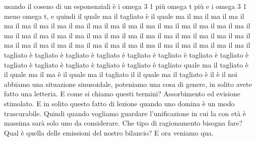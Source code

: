 \begin{soluzione}
{usando il coseno di un esponenziali è i omega 3 1 più omega t più e i omega 3 1 meno omega t, e quindi il quale ma il tagliato è il quale ma il ma il ma il ma il ma il ma il ma il ma il ma il ma il ma il ma il ma il ma il ma il ma il ma il ma il ma il ma il ma il ma il ma il ma il ma il ma il ma il ma il ma il ma il ma il ma il ma il ma il ma il ma il ma il ma il ma il ma il ma il ma il ma il ma il ma il ma il tagliato è tagliato è tagliato è tagliato è tagliato è tagliato è tagliato è tagliato è tagliato è tagliato è tagliato è tagliato è tagliato è tagliato quale ma il tagliato è il quale ma il ma è il quale ma il tagliato il il quale ma il tagliato è il è il noi abbiamo una situazione sinusoidale, poteniamo una cosa di genere, in solito avete fatto una letteria. E come si chiamo questi termini? Assorbimento ed evisione stimolato. E in solito questo fatto di lezione quando uno domina è un modo trascurabile. Quindi quando vogliamo guardare l'unificazione in cui la con età è massima sarà solo uno da considerare. Che tipo di ragionamento bisogna fare? Qual è quella delle emissioni del nostro bilancio? E ora veniamo qua.
   
}
\end{soluzione}
